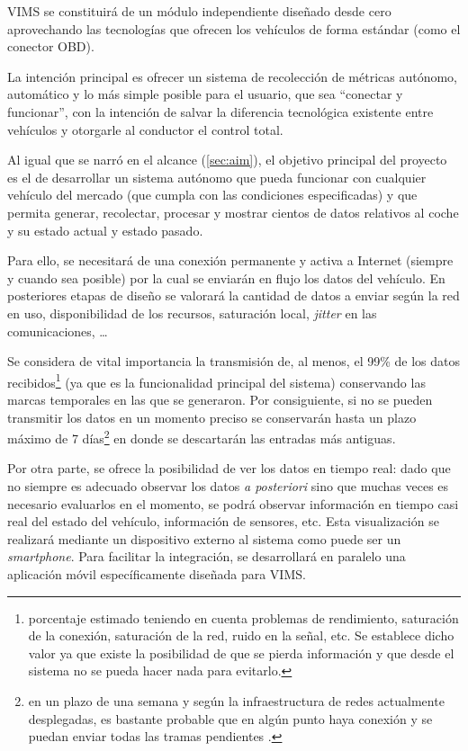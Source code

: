 \ac{VIMS} se constituirá de un módulo independiente diseñado desde cero aprovechando
las tecnologías que ofrecen los vehículos de forma estándar (como el conector
\ac{OBD}).

La intención principal es ofrecer un sistema de recolección de métricas autónomo,
automático y lo más simple posible para el usuario, que sea ``conectar y funcionar'',
con la intención de salvar la diferencia tecnológica existente entre vehículos
y otorgarle al conductor el control total.

Al igual que se narró en el alcance (\ref{sec:aim}), el objetivo principal del proyecto es
el de desarrollar un sistema autónomo que pueda funcionar con cualquier vehículo
del mercado (que cumpla con las condiciones especificadas) y que permita generar,
recolectar, procesar y mostrar cientos de datos relativos al coche y su estado
actual y estado pasado.

Para ello, se necesitará de una conexión permanente y activa a Internet (siempre
y cuando sea posible) por la cual se enviarán en flujo los datos del vehículo.
En posteriores etapas de diseño se valorará la cantidad de datos a enviar según
la red en uso, disponibilidad de los recursos, saturación local, \textit{jitter}
en las comunicaciones, \dots

Se considera de vital importancia la transmisión de, al menos, el 99\% de los
datos recibidos\footnote{porcentaje estimado teniendo en cuenta problemas de
rendimiento, saturación de la conexión, saturación de la red, ruido en la señal, etc. Se establece
dicho valor ya que existe la posibilidad de que se pierda información y que desde el
sistema no se pueda hacer nada para evitarlo.} (ya que es la funcionalidad principal 
del sistema) conservando las
marcas temporales en las que se generaron. Por consiguiente, si no se pueden
transmitir los datos en un momento preciso se conservarán hasta un plazo máximo de
7 días\footnote{en un plazo de una semana y según la infraestructura de redes
actualmente desplegadas, es bastante probable que en algún punto haya conexión
y se puedan enviar todas las tramas pendientes \cite{MobileIoTDeployment,loraallianceCoverageOperatorMaps}.} en donde se descartarán las
entradas más antiguas.

Por otra parte, se ofrece la posibilidad de ver los datos en tiempo real: dado que
no siempre es adecuado observar los datos \textit{a posteriori} sino que muchas
veces es necesario evaluarlos en el momento, se podrá observar información en
tiempo casi real del estado del vehículo, información de sensores, etc. Esta
visualización se realizará mediante un dispositivo externo al sistema como
puede ser un \textit{smartphone}. Para facilitar la integración, se desarrollará
en paralelo una aplicación móvil específicamente diseñada para \ac{VIMS}.

